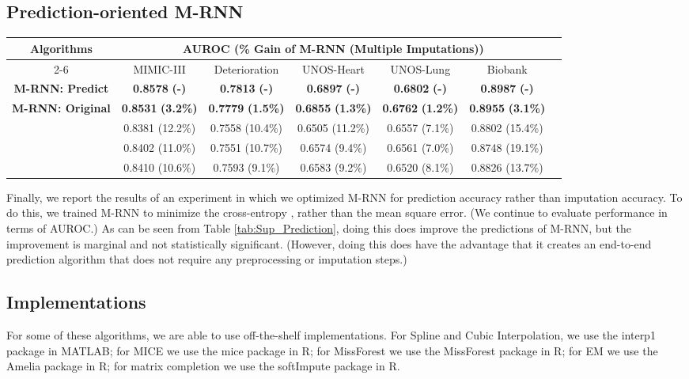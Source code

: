 \documentclass{article}
\begin{document}
\subsection*{Prediction-oriented M-RNN}

\begin{table*}[h!]
	\caption{Performance comparison for prediction oriented M-RNN}
	\label{tab:Sup_Prediction}
	\centering
	\small
	\begin{tabular}{c|c|c|c|c|c|c}
		\toprule
		\multirow{2}{*}{\textbf{Algorithms}} &\multicolumn{5}{c}{\textbf{AUROC (\% Gain of M-RNN (Multiple Imputations))}}  \\
		\cmidrule{2-6}
		 & MIMIC-III & Deterioration & UNOS-Heart & UNOS-Lung & Biobank \\
		\midrule
		\textbf{M-RNN: Predict} &  \textbf{0.8578}  \textbf{(-)}  & \textbf{0.7813}  \textbf{(-)} &\textbf{0.6897}  \textbf{(-)}&\textbf{0.6802}  \textbf{(-)} &\textbf{0.8987}  \textbf{(-)}\\
		\textbf{M-RNN: Original} &  \textbf{0.8531}  \textbf{(3.2\%)}  &\textbf{0.7779}  \textbf{(1.5\%)} &\textbf{0.6855}  \textbf{(1.3\%)}&\textbf{0.6762}  \textbf{(1.2\%)}&\textbf{0.8955}  \textbf{(3.1\%)} \\
		\midrule
		\cite{Recent_RNN1} & 0.8381  (12.2\%)& 0.7558  (10.4\%)  &0.6505 (11.2\%) &0.6557 (7.1\%)&0.8802 (15.4\%)\\
		\cite{Recent_RNN2}   & 0.8402  (11.0\%)&0.7551  (10.7\%)&0.6574 (9.4\%)  &0.6561 (7.0\%) &0.8748 (19.1\%)\\
		\cite{Recent_RNN3}   & 0.8410  (10.6\%)&0.7593  (9.1\%)&0.6583 (9.2\%)  &0.6520  (8.1\%)&0.8826 (13.7\%)\\
		\bottomrule
	\end{tabular}
\end{table*}

Finally, we report the results of an experiment in which we optimized M-RNN for prediction accuracy rather than imputation accuracy.  To do this, we trained M-RNN to minimize the cross-entropy , rather than the mean square error. (We continue to evaluate performance in terms of AUROC.)  As can be seen from Table \ref{tab:Sup_Prediction}, doing this does improve the predictions of M-RNN, but the improvement is marginal and not statistically significant.  (However, doing this does have the advantage that it creates an end-to-end prediction algorithm that does not require any  preprocessing or imputation steps.)


\subsection*{Implementations}
For some of these algorithms, we are able to use off-the-shelf implementations.  For Spline and Cubic Interpolation, we use the interp1 package in MATLAB; for MICE we use the mice package in R; for MissForest we use the MissForest package in R; for EM we use the Amelia package in R; for matrix completion we use the softImpute package in R.
    




    
    
    
\end{document}
